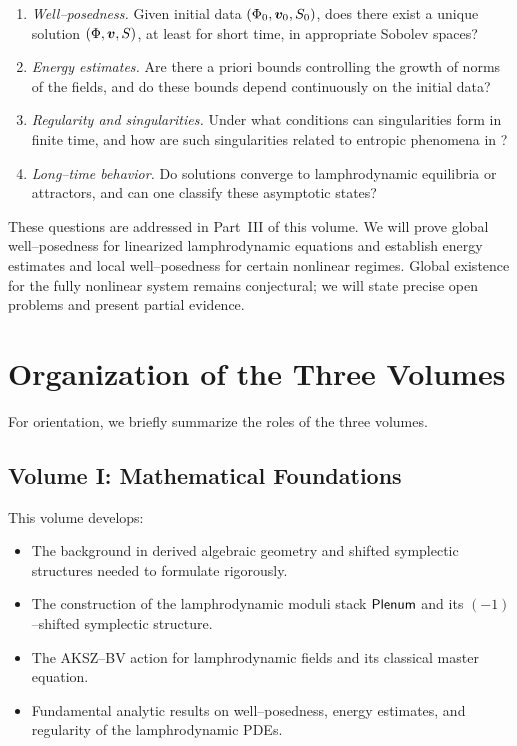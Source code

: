 \begin{enumerate}
  \item \emph{Well--posedness.} Given initial data $(\Phi_0,\bm{v}_0,S_0)$,
  does there exist a unique solution $(\Phi,\bm{v},S)$, at least
  for short time, in appropriate Sobolev spaces?

  \item \emph{Energy estimates.} Are there a priori bounds controlling the
  growth of norms of the fields, and do these bounds depend continuously on
  the initial data?

  \item \emph{Regularity and singularities.} Under what conditions can
  singularities form in finite time, and how are such singularities related to
  entropic phenomena in \rsvpabbr{}?

  \item \emph{Long--time behavior.} Do solutions converge to lamphrodynamic
  equilibria or attractors, and can one classify these asymptotic states?
\end{enumerate}

These questions are addressed in Part~III of this volume. We will prove
global well--posedness for linearized lamphrodynamic equations and establish
energy estimates and local well--posedness for certain nonlinear regimes.
Global existence for the fully nonlinear system remains conjectural; we will
state precise open problems and present partial evidence.

\section{Organization of the Three Volumes}

For orientation, we briefly summarize the roles of the three volumes.

\subsection*{Volume I: Mathematical Foundations}

This volume develops:
\begin{itemize}
  \item The background in derived algebraic geometry and shifted symplectic
  structures needed to formulate \rsvpabbr{} rigorously.
  \item The construction of the lamphrodynamic moduli stack $\mathsf{Plenum}$ and its
  $(-1)$--shifted symplectic structure.
  \item The AKSZ--BV action for lamphrodynamic fields and its classical master
  equation.
  \item Fundamental analytic results on well--posedness, energy estimates, and
  regularity of the lamphrodynamic PDEs.
\end{itemize}

